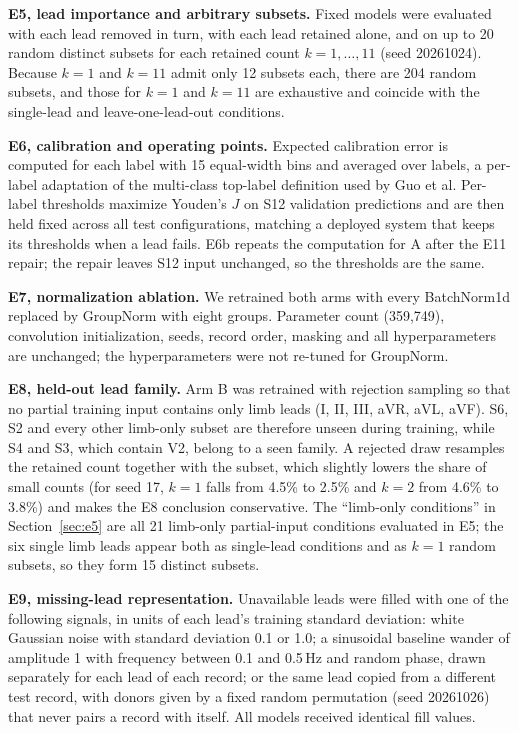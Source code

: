 \textbf{E5, lead importance and arbitrary subsets.} Fixed models were evaluated with each lead removed in turn, with each lead retained alone, and on up to 20 random distinct subsets for each retained count $k=1,\ldots,11$ (seed 20261024). Because $k=1$ and $k=11$ admit only 12 subsets each, there are 204 random subsets, and those for $k=1$ and $k=11$ are exhaustive and coincide with the single-lead and leave-one-lead-out conditions.

\textbf{E6, calibration and operating points.} Expected calibration error is computed for each label with 15 equal-width bins and averaged over labels, a per-label adaptation of the multi-class top-label definition used by Guo et al. Per-label thresholds maximize Youden's $J$ on S12 validation predictions and are then held fixed across all test configurations, matching a deployed system that keeps its thresholds when a lead fails. E6b repeats the computation for A after the E11 repair; the repair leaves S12 input unchanged, so the thresholds are the same.

\textbf{E7, normalization ablation.} We retrained both arms with every BatchNorm1d replaced by GroupNorm with eight groups. Parameter count (359,749), convolution initialization, seeds, record order, masking and all hyperparameters are unchanged; the hyperparameters were not re-tuned for GroupNorm.

\textbf{E8, held-out lead family.} Arm B was retrained with rejection sampling so that no partial training input contains only limb leads (I, II, III, aVR, aVL, aVF). S6, S2 and every other limb-only subset are therefore unseen during training, while S4 and S3, which contain V2, belong to a seen family. A rejected draw resamples the retained count together with the subset, which slightly lowers the share of small counts (for seed 17, $k=1$ falls from 4.5\% to 2.5\% and $k=2$ from 4.6\% to 3.8\%) and makes the E8 conclusion conservative. The ``limb-only conditions'' in Section~\ref{sec:e5} are all 21 limb-only partial-input conditions evaluated in E5; the six single limb leads appear both as single-lead conditions and as $k=1$ random subsets, so they form 15 distinct subsets.

\textbf{E9, missing-lead representation.} Unavailable leads were filled with one of the following signals, in units of each lead's training standard deviation: white Gaussian noise with standard deviation 0.1 or 1.0; a sinusoidal baseline wander of amplitude 1 with frequency between 0.1 and 0.5\,Hz and random phase, drawn separately for each lead of each record; or the same lead copied from a different test record, with donors given by a fixed random permutation (seed 20261026) that never pairs a record with itself. All models received identical fill values.

